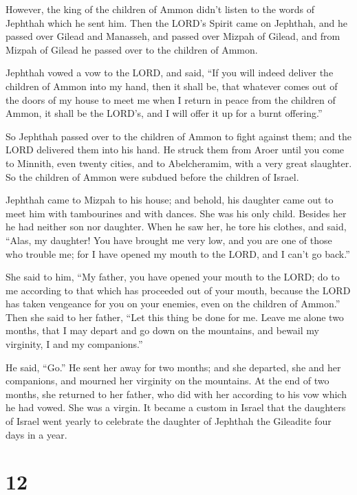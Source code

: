  However, the king of the children of Ammon didn't listen
to the words of Jephthah which he sent him.  Then the
LORD's Spirit came on Jephthah, and he passed over Gilead and Manasseh,
and passed over Mizpah of Gilead, and from Mizpah of Gilead he passed
over to the children of Ammon.

 Jephthah vowed a vow to the LORD, and said, ``If you
will indeed deliver the children of Ammon into my hand, 
then it shall be, that whatever comes out of the doors of my house to
meet me when I return in peace from the children of Ammon, it shall be
the LORD's, and I will offer it up for a burnt offering.''

 So Jephthah passed over to the children of Ammon to
fight against them; and the LORD delivered them into his hand.
 He struck them from Aroer until you come to Minnith,
even twenty cities, and to Abelcheramim, with a very great slaughter. So
the children of Ammon were subdued before the children of Israel.

 Jephthah came to Mizpah to his house; and behold, his
daughter came out to meet him with tambourines and with dances. She was
his only child. Besides her he had neither son nor daughter.
 When he saw her, he tore his clothes, and said, ``Alas,
my daughter! You have brought me very low, and you are one of those who
trouble me; for I have opened my mouth to the LORD, and I can't go
back.''

 She said to him, ``My father, you have opened your mouth
to the LORD; do to me according to that which has proceeded out of your
mouth, because the LORD has taken vengeance for you on your enemies,
even on the children of Ammon.''  Then she said to her
father, ``Let this thing be done for me. Leave me alone two months, that
I may depart and go down on the mountains, and bewail my virginity, I
and my companions.''

 He said, ``Go.'' He sent her away for two months; and
she departed, she and her companions, and mourned her virginity on the
mountains.  At the end of two months, she returned to her
father, who did with her according to his vow which he had vowed. She
was a virgin. It became a custom in Israel  that the
daughters of Israel went yearly to celebrate the daughter of Jephthah
the Gileadite four days in a year.

\hypertarget{section-11}{%
\section{12}\label{section-11}}

